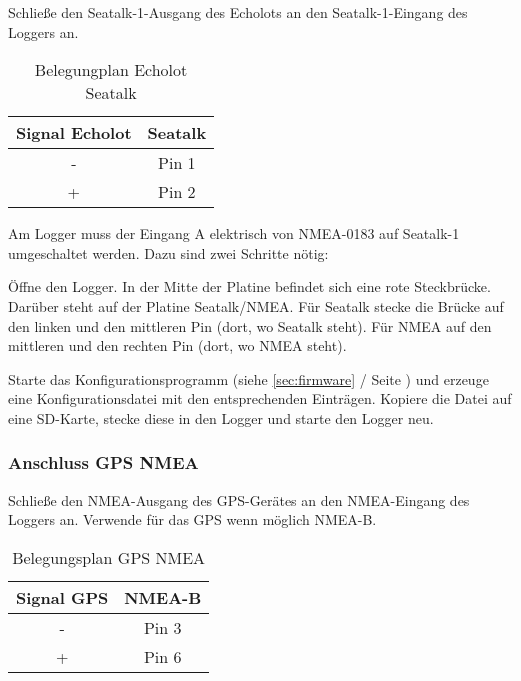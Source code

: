 \documentclass[pdftex, fontsize=8pt, paper=130mm:92mm,pagesize]{scrartcl}
\begin{document}
Schließe den Seatalk-1-Ausgang des Echolots an den Seatalk-1-Eingang des Loggers an. 

\begin{table}[H]
\centering
{}
\begin{tabular}{cc} \toprule
Signal Echolot & Seatalk\\ \midrule
- & Pin 1\\
+ & Pin 2\\ \bottomrule
\end{tabular}	
\caption{Belegungplan Echolot Seatalk}
\end{table}

Am Logger muss der Eingang A elektrisch von NMEA-0183 auf Seatalk-1 umgeschaltet werden. Dazu sind zwei Schritte nötig:

\begin{compactenum}
 \item Öffne den Logger. In der Mitte der Platine befindet sich eine rote Steckbrücke. Darüber steht auf der Platine \glqq Seatalk/NMEA\grqq{}. Für Seatalk stecke die Brücke auf den linken und den mittleren Pin (dort, wo \glqq Seatalk\grqq{} steht). Für NMEA auf den mittleren und den rechten Pin (dort, wo \glqq NMEA\grqq{} steht). 

\item Starte das Konfigurationsprogramm (siehe \ref{sec:firmware}  / Seite \pageref{sec:firmware}) und erzeuge eine Konfigurationsdatei mit den entsprechenden Einträgen. Kopiere die Datei auf eine SD-Karte, stecke diese in den Logger und starte den Logger neu. 
\end{compactenum}

\subsubsection{Anschluss GPS NMEA}

Schließe den NMEA-Ausgang des GPS-Gerätes an den NMEA-Eingang des Loggers an. Verwende für das GPS wenn möglich NMEA-B. 

\begin{table}[H]
\centering
{}
\begin{tabular}{cc} \toprule
Signal GPS & NMEA-B\\ \midrule
- & Pin 3\\
+ & Pin 6\\ \bottomrule
\end{tabular}	
\caption{Belegungsplan GPS NMEA}
\end{table}
\end{document}

